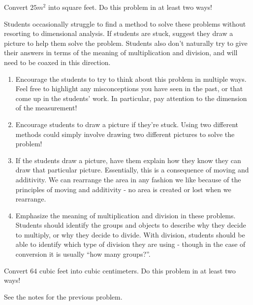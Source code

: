 \documentclass{ximera}
\begin{document}
\begin{problem}
Convert $25m^2$ into square feet.  Do this problem in at least two ways!
\begin{instructorNotes}
Students occasionally struggle to find a method to solve these problems without resorting to dimensional analysis.  If students are stuck, suggest they draw a picture to help them solve the problem.  Students also don't naturally try to give their answers in terms of the meaning of multiplication and division, and will need to be coaxed in this direction.
\begin{enumerate}
	\item Encourage the students to try to think about this problem in multiple ways.  Feel free to highlight any misconceptions you have seen in the past, or that come up in the students' work.  In particular, pay attention to the dimension of the measurement!
	\item Encourage students to draw a picture if they're stuck.  Using two different methods could simply involve drawing two different pictures to solve the problem!
	\item If the students draw a picture, have them explain how they know they can draw that particular picture.  Essentially, this is a consequence of moving and additivity.  We can rearrange the area in any fashion we like because of the principles of moving and additivity - no area is created or lost when we rearrange. 
	\item Emphasize the meaning of multiplication and division in these problems.  Students should identify the groups and objects to describe why they decide to multiply, or why they decide to divide.  With division, students should be able to identify which type of division they are using - though in the case of conversion it is usually ``how many groups?''.
\end{enumerate}

\end{instructorNotes}
\end{problem}

\begin{problem}
Convert $64$ cubic feet into cubic centimeters.  Do this problem in at least two ways!

\begin{instructorNotes}
See the notes for the previous problem.
\end{instructorNotes}
\end{problem}
\end{document}
